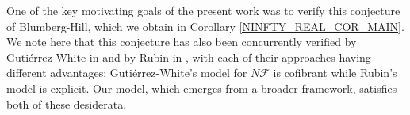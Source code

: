 \documentclass[a4paper,10pt]{article}%
\begin{document}
One of the key motivating goals of the present work was to verify this conjecture of Blumberg-Hill, which we obtain in
Corollary \ref{NINFTY_REAL_COR_MAIN}.
We note here that this conjecture has also been concurrently verified
by Guti\'{e}rrez-White in \cite{GW17} 
and by Rubin in \cite{Rub17}, 
with each of their approaches having different advantages:
Guti\'{e}rrez-White's
model for $N \mathcal{F}$
is cofibrant 
while Rubin's model is explicit.
Our model, which emerges from a broader framework, satisfies both of these desiderata.

\end{document}
